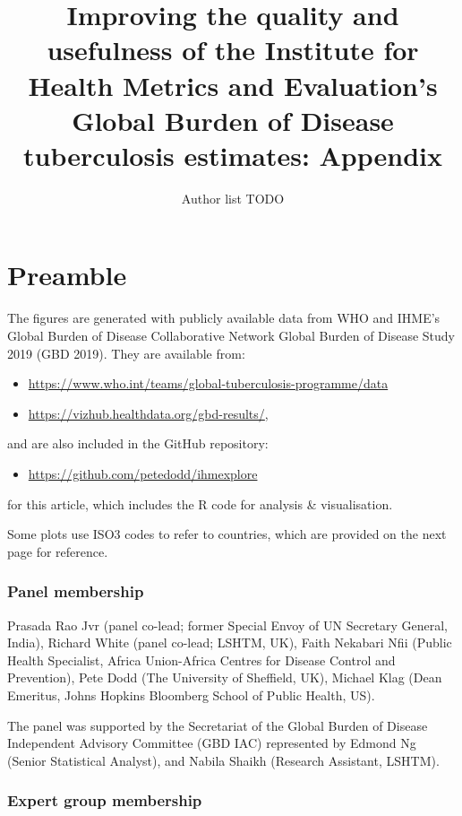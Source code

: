 \documentclass[12pt]{article}
\author{Author list TODO}
\date{}
\title{Improving the quality and usefulness of the Institute for Health Metrics
  and Evaluation's Global Burden of Disease tuberculosis estimates: Appendix}
\begin{document}
\maketitle

\listoffigures

\newpage

\section*{Preamble}
\label{sec:orga0b5156}

The figures are generated with
publicly available data from WHO and IHME's Global Burden of Disease Collaborative
Network Global Burden of Disease Study 2019 (GBD 2019). They are available from:

\begin{itemize}
\item \url{https://www.who.int/teams/global-tuberculosis-programme/data}
\item \url{https://vizhub.healthdata.org/gbd-results/},
\end{itemize}
and are also included in the GitHub repository:

\begin{itemize}
\item \url{https://github.com/petedodd/ihmexplore}
\end{itemize}
for this article, which includes
the R code for analysis \& visualisation.

Some plots use ISO3 codes to refer to countries, which are provided on the next
page for reference.

\subsubsection*{Panel membership}
Prasada Rao Jvr (panel co-lead; former Special Envoy of UN Secretary General, India),
Richard White (panel co-lead; LSHTM, UK),  Faith Nekabari Nfii (Public
Health Specialist, Africa Union-Africa Centres for Disease Control and
Prevention), Pete Dodd (The University of Sheffield, UK),
Michael Klag (Dean Emeritus, Johns Hopkins Bloomberg School of Public Health, US).


The panel was supported by the Secretariat of the Global Burden of Disease
Independent Advisory Committee (GBD IAC) represented by Edmond Ng (Senior
Statistical Analyst), and Nabila Shaikh (Research Assistant, LSHTM).


\subsubsection*{Expert group membership}
\end{document}
